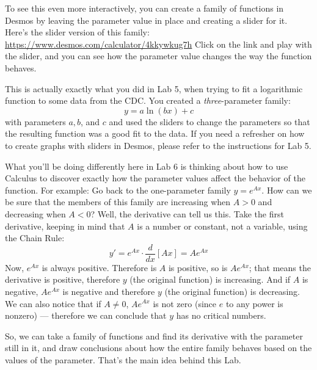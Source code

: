 \documentclass[11pt,letterpaper]{article}
\begin{document}
To see this even more interactively, you can create a family of functions in Desmos by leaving the parameter value in place and creating a slider for it. Here's the slider version of this family: \url{https://www.desmos.com/calculator/4kkywkug7h} Click on the link and play with the slider, and you can see how the parameter value changes the way the function behaves. 

This is actually exactly what you did in Lab 5, when trying to fit a logarithmic function to some data from the CDC. You created a \emph{three}-parameter family: 
$$y = a \ln(bx) + c$$
with parameters $a,b$, and $c$ and used the sliders to change the parameters so that the resulting function was a good fit to the data. If you need a refresher on how to create graphs with sliders in Desmos, please refer to the instructions for Lab 5. 

What you'll be doing differently here in Lab 6 is thinking about how to use Calculus to discover exactly how the parameter values affect the behavior of the function. For example: Go back to the one-parameter family $y = e^{Ax}$. How can we be sure that the members of this family are increasing when $A > 0$ and decreasing when $A < 0$? Well, the derivative can tell us this. Take the first derivative, keeping in mind that $A$ is a number or constant, not a variable, using the Chain Rule: 
$$y' = e^{Ax} \cdot \frac{d}{dx}[Ax] = Ae^{Ax}$$
Now, $e^{Ax}$ is always positive. Therefore is $A$ is positive, so is $Ae^{Ax}$; that means the derivative is positive, therefore $y$ (the original function) is increasing. And if $A$ is negative, $Ae^{Ax}$ is negative and therefore $y$ (the original function) is decreasing. We can also notice that if $A \neq 0$, $A e^{Ax}$ is not zero (since $e$ to any power is nonzero) --- therefore we can conclude that $y$ has no critical numbers. 

So, we can take a family of functions and find its derivative with the parameter still in it, and draw conclusions about how the entire family behaves based on the values of the parameter. That's the main idea behind this Lab. 
\end{document}
